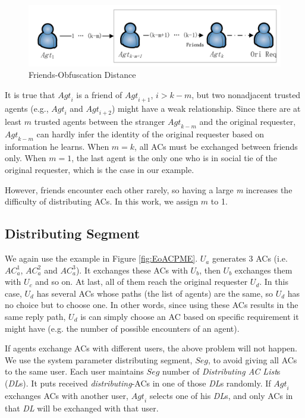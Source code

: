 \begin{figure} [hbtp]
  \centering 
  \includegraphics[width=6.0in]{figures/ACPFriObfDis.png}
  \caption{Friends-Obfuscation Distance} 
  \label{fig:FriObfuscationDistance} %
\end{figure}

It is true that ${Agt}_i$ is a friend of ${Agt}_{i+1}$, $i>k-m$, but two nonadjacent trusted agents (e.g., ${Agt}_i$ and ${Agt}_{i+2}$) might have a weak relationship. Since there are at least $m$ trusted agents between the stranger ${Agt}_{k-m}$ and the original requester, ${Agt}_{k-m}$ can hardly infer the identity of the original requester based on information he learns. When $m=k$, all ACs must be exchanged between friends only. When $m=1$, the last agent is the only one who is in social tie of the original requester, which is the case in our example.

However, friends encounter each other rarely, so having a large \textit{m} increases the difficulty of distributing ACs. In this work, we assign $m$ to 1.



\subsection{ Distributing Segment}

\noindent We again use the example in Figure \ref{fig:EoACPME}. $U_a$ generates 3 ACs (i.e. ${AC}^1_a$, ${AC}^2_a$ and ${AC}^3_a$). It exchanges these ACs with $U_b$, then $U_b$ exchanges them with $U_c$ and so on. At last, all of them reach the original requester $U_d$. In this case, $U_d$ has several ACs whose paths (the list of agents) are the same, so $U_d$ has no choice but to choose one. In other words, since using these ACs results in the same reply path, $U_d$ is can simply choose an AC based on specific requirement it might have (e.g. the number of possible encounters of an agent). 

If agents exchange ACs with different users, the above problem will not happen. We use the system parameter distributing segment, $Seg$, to avoid giving all ACs to the same user. Each user maintains $Seg$ number of \textit{Distributing AC List}s (\textit{DL}s). It puts received \textit{distributing}-ACs in one of those \textit{DL}s randomly. If ${Agt}_i$ exchanges ACs with another user, ${Agt}_i$ selects one of his \textit{DL}s, and only ACs in that \textit{DL} will be exchanged with that user.

